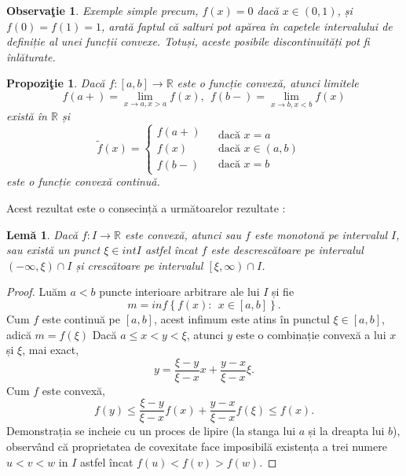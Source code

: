 \documentclass[a4paper,12pt,oneside]{report}
\newtheorem{proposition}{Propozi\c tie}
\newtheorem{remark}{Observa\c{t}ie}
\newtheorem{lemma}{Lem\u{a}}
\begin{document}
 \begin{remark}
	Exemple simple precum, \(f\left ( x \right )= 0\) dacă \(x\in \left ( 0 , 1 \right )\), și  \(f\left ( 0 \right )= f\left ( 1 \right ) = 1\), arată faptul că salturi  pot apărea în capetele intervalului de definiție al unei funcții convexe. Totuși, aceste posibile discontinuități pot fi înlăturate.
\end{remark}


\begin{proposition}
Dacă \(f: \left [ a, b \right ]\rightarrow \mathbb{R}\) este o funcție convexă, atunci limitele
\[
f\left ( a+ \right ) = \lim_{x\rightarrow a, x> a}f\left ( x \right ),~~ f\left ( b- \right ) = \lim_{x\rightarrow b, x< b}f\left ( x \right )\] există în \(\mathbb{R}\) și
\begin{displaymath}
  \tilde{f}\left ( x \right )= \left\{\begin{matrix}
f\left ( a+ \right ) & \\
 f\left ( x \right )& \\
 f\left ( b- \right )&
\end{matrix} \begin{matrix}
\text{dacă } x=a & \\
\text{dacă } x\in \left ( a,b \right ) & \\
\text{dacă } x= b&
\end{matrix}\right.
\end{displaymath}
 este o funcție convexă continuă.
\end{proposition}
	Acest rezultat este o consecință a următoarelor rezultate :
\begin{lemma}

Dacă \(f: I \rightarrow \mathbb{R}\) este convexă, atunci sau \(f\) este monotonă pe intervalul \(I\), sau există un punct \(\xi \in int I\) astfel încat \(f\) este descrescătoare pe intervalul \(\left ( -\infty , \xi  \right )\cap I\) și crescătoare pe intervalul \(\left[\xi , \infty  \right )\cap I\).
\end{lemma}
\begin{proof}
Luăm \(a < b\) puncte interioare arbitrare ale lui \(I\) și fie
\[m = inf\left \{ f\left ( x \right ): ~~x\in \left [ a,b \right ]\right \}.\] Cum \(f\) este continuă pe \(\left [ a,b \right ]\), acest infimum este atins în punctul \(\xi \in \left [ a,b \right ]\), adică
$
  m = f\left ( \xi  \right )
$
Dacă \(a \leq x <  y< \xi\), atunci \(y\) este o combinație convexă a lui \(x\) și \(\xi\), mai exact, \[y = \frac{\xi -y}{\xi -x}x + \frac{y - x}{\xi -x}\xi.\] Cum \(f\) este convexă,
\begin{displaymath}
  f\left ( y \right )\leq \frac{\xi -y}{\xi -x}f\left ( x \right )+ \frac{y-x}{\xi -x}f\left ( \xi  \right )\leq f\left ( x \right ).
\end{displaymath}
Demonstrația se incheie cu un proces de lipire (la stanga lui \(a\) și la dreapta lui \(b\)), observând că proprietatea de covexitate face imposibilă existența a trei numere \(u < v < w\) in \(I\) astfel încat \(f\left ( u \right ) < f\left ( v \right )> f\left ( w \right )\).
\end{proof}
\end{document}
